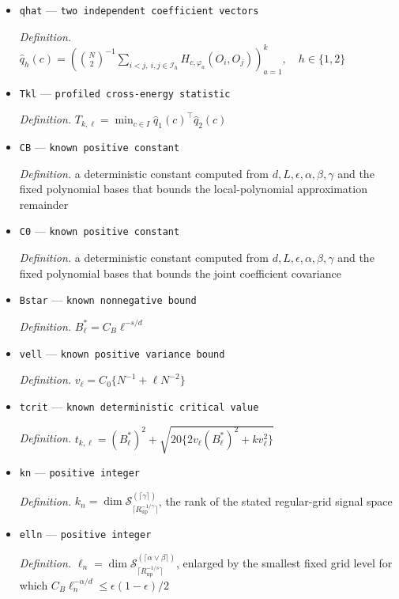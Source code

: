 \documentclass{article}
\begin{document}
\begin{itemize}
  \par\smallskip\noindent\emph{Definition.} \((\mathcal I_1,\mathcal I_2)\) is the fixed partition of \(\{1,\ldots,2N\}\) with \(\lvert\mathcal I_1\rvert=\lvert\mathcal I_2\rvert=N\)
  \item \texttt{qhat} --- \texttt{two independent coefficient vectors}
  \par\smallskip\noindent\emph{Definition.} \(\widehat q_h(c)=(\binom{N}{2}^{-1}\sum_{i<j,\ i,j\in\mathcal I_h}H_{c,\varphi_a}(O_i,O_j))_{a=1}^k,\quad h\in\{1,2\}\)
  \item \texttt{Tkl} --- \texttt{profiled cross-\allowbreak{}energy statistic}
  \par\smallskip\noindent\emph{Definition.} \(T_{k,\ell}=\min_{c\in I}\widehat q_1(c)^\top\widehat q_2(c)\)
  \item \texttt{CB} --- \texttt{known positive constant}
  \par\smallskip\noindent\emph{Definition.} a deterministic constant computed from \(d,L,\epsilon,\alpha,\beta,\gamma\) and the fixed polynomial bases that bounds the local-polynomial approximation remainder
  \item \texttt{C0} --- \texttt{known positive constant}
  \par\smallskip\noindent\emph{Definition.} a deterministic constant computed from \(d,L,\epsilon,\alpha,\beta,\gamma\) and the fixed polynomial bases that bounds the joint coefficient covariance
  \item \texttt{Bstar} --- \texttt{known nonnegative bound}
  \par\smallskip\noindent\emph{Definition.} \(B_\ell^*=C_B\ell^{-s/d}\)
  \item \texttt{vell} --- \texttt{known positive variance bound}
  \par\smallskip\noindent\emph{Definition.} \(v_\ell=C_0\{N^{-1}+\ell N^{-2}\}\)
  \item \texttt{tcrit} --- \texttt{known deterministic critical value}
  \par\smallskip\noindent\emph{Definition.} \(t_{k,\ell}=(B_\ell^*)^2+\sqrt{20\{2v_\ell(B_\ell^*)^2+k v_\ell^2\}}\)
  \item \texttt{kn} --- \texttt{positive integer}
  \par\smallskip\noindent\emph{Definition.} \(k_n=\dim\mathcal S_{\lceil R_{\mathrm{up}}^{-1/\gamma}\rceil}^{(\lceil\gamma\rceil)}\), the rank of the stated regular-grid signal space
  \item \texttt{elln} --- \texttt{positive integer}
  \par\smallskip\noindent\emph{Definition.} \(\ell_n=\dim\mathcal S_{\lceil R_{\mathrm{up}}^{-1/s}\rceil}^{(\lceil\alpha\vee\beta\rceil)}\), enlarged by the smallest fixed grid level for which \(C_B\ell_n^{-\alpha/d}\le\epsilon(1-\epsilon)/2\)

\end{itemize}
\end{document}
